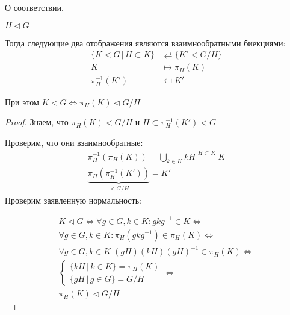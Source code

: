 \begin{theorem}
    О соответствии.

    $H \vartriangleleft G$

    Тогда следующие два отображения являются взаимнообратными биекциями:
    \begin{align*}
        \{ K < G \, | \, H \subset K \} & \rightleftarrows  \{ K' < G / H \} \\
        K &\mapsto \pi_H(K) \\
        \pi^{-1}_{H}(K') &\mapsfrom K'
    \end{align*}

    При этом $K \vartriangleleft G \Longleftrightarrow \pi_{H}(K) \vartriangleleft G / H$
    
    \begin{proof}
        Знаем, что $\pi_H(K) < G / H$ и $H \subset \pi^{-1}_{H}(K') < G$

        Проверим, что они взаимнообратные:
        \begin{gather*}
            \pi^{-1}_{H}(\pi_{H}(K)) = \bigcup_{k \in K} kH \stackrel{H \subset K}{=} K \\
            \underbrace{\pi_H(\pi^{-1}_{H}(K'))}_{< G/H} = K'
        \end{gather*}
        Проверим заявленную нормальность:

        \begin{gather*}
            K \vartriangleleft G \Longleftrightarrow \forall g \in G, k \in K: gkg^{-1} \in K \Longleftrightarrow \\ 
            \forall g \in G, k \in K: \pi_{H}(gkg^{-1}) \in \pi_{H}(K) \Longleftrightarrow \\
            \forall g \in G, k \in K \; (gH)(kH)(gH)^{-1} \in \pi_H(K) \Longleftrightarrow \\
            \begin{cases}
                \{ kH \, | \, k \in K \} = \pi_H(K) \\
                \{ gH \, | \, g \in G \} = G / H
            \end{cases} \Longleftrightarrow \\
            \pi_H(K) \vartriangleleft G / H
        \end{gather*}
    \end{proof}

\end{theorem}